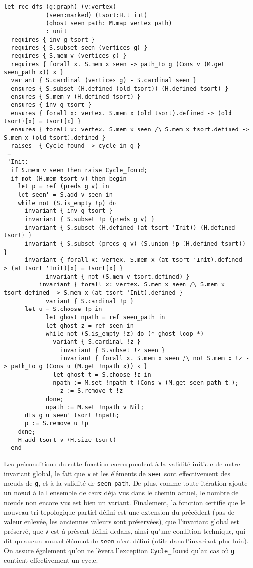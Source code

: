 \documentclass[a4paper,10pt]{article}
\begin{document}
\begin{lstlisting}
let rec dfs (g:graph) (v:vertex)
            (seen:marked) (tsort:H.t int)
            (ghost seen_path: M.map vertex path)
            : unit
  requires { inv g tsort }
  requires { S.subset seen (vertices g) }
  requires { S.mem v (vertices g) }
  requires { forall x. S.mem x seen -> path_to g (Cons v (M.get seen_path x)) x }
  variant { S.cardinal (vertices g) - S.cardinal seen }
  ensures { S.subset (H.defined (old tsort)) (H.defined tsort) }
  ensures { S.mem v (H.defined tsort) }
  ensures { inv g tsort }
  ensures { forall x: vertex. S.mem x (old tsort).defined -> (old tsort)[x] = tsort[x] }
  ensures { forall x: vertex. S.mem x seen /\ S.mem x tsort.defined -> S.mem x (old tsort).defined }
  raises  { Cycle_found -> cycle_in g }
 =
 'Init:
  if S.mem v seen then raise Cycle_found;
  if not (H.mem tsort v) then begin
    let p = ref (preds g v) in
    let seen' = S.add v seen in
    while not (S.is_empty !p) do
      invariant { inv g tsort }
      invariant { S.subset !p (preds g v) }
      invariant { S.subset (H.defined (at tsort 'Init)) (H.defined tsort) }
      invariant { S.subset (preds g v) (S.union !p (H.defined tsort)) }
      invariant { forall x: vertex. S.mem x (at tsort 'Init).defined -> (at tsort 'Init)[x] = tsort[x] }
			invariant { not (S.mem v tsort.defined) }
		  invariant { forall x: vertex. S.mem x seen /\ S.mem x tsort.defined -> S.mem x (at tsort 'Init).defined }
			variant { S.cardinal !p }
      let u = S.choose !p in
			let ghost npath = ref seen_path in
			let ghost z = ref seen in
			while not (S.is_empty !z) do (* ghost loop *)
			  variant { S.cardinal !z }
				invariant { S.subset !z seen }
				invariant { forall x. S.mem x seen /\ not S.mem x !z -> path_to g (Cons u (M.get !npath x)) x }
			  let ghost t = S.choose !z in
			  npath := M.set !npath t (Cons v (M.get seen_path t));
				z := S.remove t !z
			done;
			npath := M.set !npath v Nil;
      dfs g u seen' tsort !npath;
      p := S.remove u !p
    done;
    H.add tsort v (H.size tsort)
  end
\end{lstlisting}

Les préconditions de cette fonction correspondent à la validité initiale de notre invariant global, le fait que \lstinline{v} et les éléments de \lstinline{seen} sont effectivement des nœuds de \lstinline{g}, et à la validité de \lstinline{seen_path}. De plus, comme toute itération ajoute un nœud à la l'ensemble de ceux déjà vus dans le chemin actuel, le nombre de nœuds non encore vus est bien un variant. Finalement, la fonction certifie que le nouveau tri topologique partiel défini est une extension du précédent (pas de valeur enlevée, les anciennes valeurs sont préservées), que l'invariant global est préservé, que \lstinline{v} est à présent défini dedans, ainsi qu'une condition technique, qui dit qu'aucun nouvel élément de \lstinline{seen} n'est défini (utile dans l'invariant plus loin). On assure également qu'on ne lèvera l'exception \lstinline{Cycle_found} qu'au cas où \lstinline{g} contient effectivement un cycle.
\end{document}
